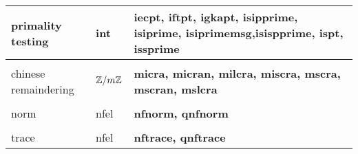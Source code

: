 \begin{center}
\begin{tabular}{|p{1.0in}|p{0.7in}|p{3.5in}|}
primality \newline
testing &
int &
{\bf iecpt, iftpt, igkapt, isipprime, isiprime, \newline
isiprimemsg,isispprime, ispt, issprime}\\[1.5ex]
\hline &&\\[-1.3ex]

chinese \newline
remaindering &
$\mbox{$\mathbb Z$}/m\mbox{$\mathbb Z$}$ &
{\bf micra, micran, milcra, miscra, mscra, mscran, mslcra}\\[1.5ex]
\hline &&\\[-1.3ex]

norm &
nfel &
{\bf nfnorm, qnfnorm}\\[1.5ex]
\hline &&\\[-1.3ex]

trace &
nfel &
{\bf nftrace, qnftrace}\\[1.5ex]
\hline
\end{tabular}
\end{center}

\newpage

